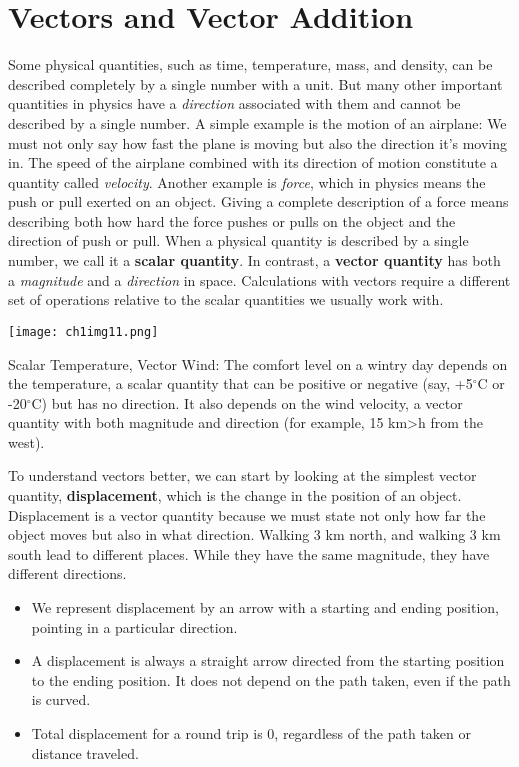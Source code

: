 \section{Vectors and Vector Addition}
Some physical quantities, such as time, temperature, mass, and density, can be described completely by a single number with a unit. But many other important quantities in physics have a \textit{direction} associated with them and cannot be described by a single number. A simple example is the motion of an airplane: We must not only say how fast the plane is moving but also the direction it's moving in. The speed of the airplane combined with its direction of motion constitute a quantity called \textit{velocity}. Another example is \textit{force}, which in physics means the push or pull exerted on an object. 
Giving a complete description of a force means describing both how hard the force pushes or pulls on the object and the direction of push or pull. When a physical quantity is described by a single number, we call it a \textbf{scalar quantity}. In contrast, a \textbf{vector quantity} has both a \textit{magnitude} and a \textit{direction} in space. Calculations with vectors require a different set of operations relative to the scalar quantities we usually work with.

\begin{infobox}
    \begin{center}
        \texttt{[image: ch1img11.png]}
    \end{center}
Scalar Temperature, Vector Wind: The comfort level on a wintry day depends on the temperature, a scalar quantity that can be positive or negative (say, +5$^{\circ}$C or -20$^{\circ}$C) but has no direction. It also depends on the wind velocity, a vector quantity with both magnitude and direction (for example, 15 km>h from the west).
\end{infobox}

To understand vectors better, we can start by looking at the simplest vector quantity, \textbf{displacement}, which is the change in the position of an object. Displacement is a vector quantity because we must state not only how far the object moves but also in what direction. Walking 3 km north, and walking 3 km south lead to different places. While they have the same magnitude, they have different directions. 
\begin{itemize}
\item We represent displacement by an arrow with a starting and ending position, pointing in a particular direction.
\item A displacement is always a straight arrow directed from the starting position to the ending position. It does not depend on the path taken, even if the path is curved.
\item Total displacement for a round trip is 0, regardless of the path taken or distance traveled.
\end{itemize}

